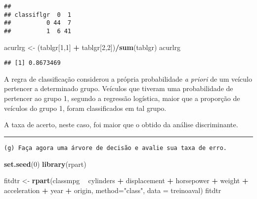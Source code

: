 \documentclass[]{article}
\newenvironment{Shaded}{\begin{snugshade}}{\end{snugshade}}
\newcommand{\KeywordTok}[1]{\textcolor[rgb]{0.13,0.29,0.53}{\textbf{#1}}}
\newcommand{\DataTypeTok}[1]{\textcolor[rgb]{0.13,0.29,0.53}{#1}}
\newcommand{\DecValTok}[1]{\textcolor[rgb]{0.00,0.00,0.81}{#1}}
\newcommand{\StringTok}[1]{\textcolor[rgb]{0.31,0.60,0.02}{#1}}
\newcommand{\OperatorTok}[1]{\textcolor[rgb]{0.81,0.36,0.00}{\textbf{#1}}}
\newcommand{\NormalTok}[1]{#1}
\begin{document}
\begin{verbatim}
##           
## classiflgr  0  1
##          0 44  7
##          1  6 41
\end{verbatim}

\begin{Shaded}
\begin{Highlighting}[]
\NormalTok{acurlrg <-}\StringTok{ }\NormalTok{(tablgr[}\DecValTok{1}\NormalTok{,}\DecValTok{1}\NormalTok{] }\OperatorTok{+}\StringTok{ }\NormalTok{tablgr[}\DecValTok{2}\NormalTok{,}\DecValTok{2}\NormalTok{])}\OperatorTok{/}\KeywordTok{sum}\NormalTok{(tablgr)}
\NormalTok{acurlrg}
\end{Highlighting}
\end{Shaded}

\begin{verbatim}
## [1] 0.8673469
\end{verbatim}

\begin{Shaded}
\end{Shaded}

A regra de classificação considerou a própria probabilidade \emph{a
priori} de um veículo pertencer a determinado grupo. Veículos que
tiveram uma probabilidade de pertencer ao grupo 1, segundo a regressão
logística, maior que a proporção de veículos do grupo 1, foram
classificados em tal grupo.

A taxa de acerto, neste caso, foi maior que o obtido da análise
discriminante.

\begin{center}\rule{0.5\linewidth}{\linethickness}\end{center}

\begin{verbatim}
(g) Faça agora uma árvore de decisão e avalie sua taxa de erro.
\end{verbatim}

\begin{Shaded}
\begin{Highlighting}[]
\KeywordTok{set.seed}\NormalTok{(}\DecValTok{0}\NormalTok{)}
\KeywordTok{library}\NormalTok{(rpart)}

\NormalTok{fitdtr <-}\StringTok{ }\KeywordTok{rpart}\NormalTok{(classmpg }\OperatorTok{~}\StringTok{ }\NormalTok{cylinders }\OperatorTok{+}\StringTok{ }\NormalTok{displacement }\OperatorTok{+}\StringTok{ }\NormalTok{horsepower }\OperatorTok{+}\StringTok{ }\NormalTok{weight }\OperatorTok{+}\StringTok{ }\NormalTok{acceleration }\OperatorTok{+}\StringTok{ }\NormalTok{year }\OperatorTok{+}\StringTok{ }\NormalTok{origin,}
             \DataTypeTok{method=}\StringTok{"class"}\NormalTok{, }\DataTypeTok{data =}\NormalTok{ treinoaval)}
\NormalTok{fitdtr}
\end{Highlighting}
\end{Shaded}
\end{document}
